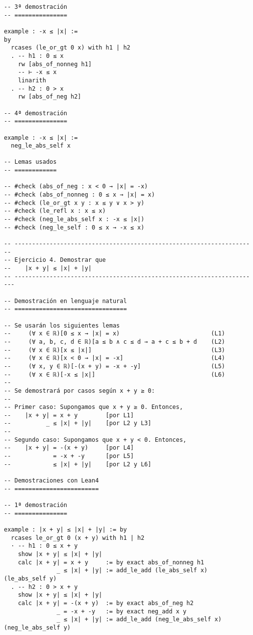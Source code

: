 \begin{verbatim}
-- 3ª demostración
-- ===============

example : -x ≤ |x| :=
by
  rcases (le_or_gt 0 x) with h1 | h2
  . -- h1 : 0 ≤ x
    rw [abs_of_nonneg h1]
    -- ⊢ -x ≤ x
    linarith
  . -- h2 : 0 > x
    rw [abs_of_neg h2]

-- 4ª demostración
-- ===============

example : -x ≤ |x| :=
  neg_le_abs_self x

-- Lemas usados
-- ============

-- #check (abs_of_neg : x < 0 → |x| = -x)
-- #check (abs_of_nonneg : 0 ≤ x → |x| = x)
-- #check (le_or_gt x y : x ≤ y ∨ x > y)
-- #check (le_refl x : x ≤ x)
-- #check (neg_le_abs_self x : -x ≤ |x|)
-- #check (neg_le_self : 0 ≤ x → -x ≤ x)

-- ---------------------------------------------------------------------
-- Ejercicio 4. Demostrar que
--    |x + y| ≤ |x| + |y|
-- ----------------------------------------------------------------------

-- Demostración en lenguaje natural
-- ================================

-- Se usarán los siguientes lemas
--     (∀ x ∈ ℝ)[0 ≤ x → |x| = x)                          (L1)
--     (∀ a, b, c, d ∈ ℝ)[a ≤ b ∧ c ≤ d → a + c ≤ b + d    (L2)
--     (∀ x ∈ ℝ)[x ≤ |x|]                                  (L3)
--     (∀ x ∈ ℝ)[x < 0 → |x| = -x]                         (L4)
--     (∀ x, y ∈ ℝ)[-(x + y) = -x + -y]                    (L5)
--     (∀ x ∈ ℝ)[-x ≤ |x|]                                 (L6)
--
-- Se demostrará por casos según x + y ≥ 0:
--
-- Primer caso: Supongamos que x + y ≥ 0. Entonces,
--    |x + y| = x + y        [por L1]
--          _ ≤ |x| + |y|    [por L2 y L3]
--
-- Segundo caso: Supongamos que x + y < 0. Entonces,
--    |x + y| = -(x + y)     [por L4]
--            = -x + -y      [por L5]
--            ≤ |x| + |y|    [por L2 y L6]

-- Demostraciones con Lean4
-- ========================

-- 1ª demostración
-- ===============

example : |x + y| ≤ |x| + |y| := by
  rcases le_or_gt 0 (x + y) with h1 | h2
  · -- h1 : 0 ≤ x + y
    show |x + y| ≤ |x| + |y|
    calc |x + y| = x + y     := by exact abs_of_nonneg h1
               _ ≤ |x| + |y| := add_le_add (le_abs_self x) (le_abs_self y)
  . -- h2 : 0 > x + y
    show |x + y| ≤ |x| + |y|
    calc |x + y| = -(x + y)  := by exact abs_of_neg h2
               _ = -x + -y   := by exact neg_add x y
               _ ≤ |x| + |y| := add_le_add (neg_le_abs_self x) (neg_le_abs_self y)


\end{verbatim}

